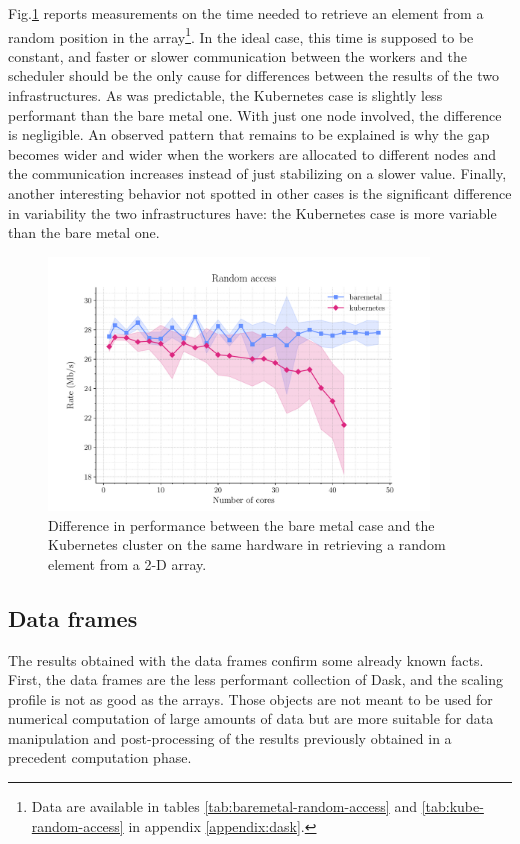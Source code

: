 Fig.\ref{fig:array-random-access} reports measurements on the time needed to
retrieve an element from a random position in the array\footnote{Data are
available in tables \ref{tab:baremetal-random-access} and
\ref{tab:kube-random-access} in appendix \ref{appendix:dask}.}. In the ideal
case, this time is supposed to be constant, and faster or slower communication
between the workers and the scheduler should be the only cause for differences
between the results of the two infrastructures. As was predictable, the
Kubernetes case is slightly less performant than the bare metal one. With just
one node involved, the difference is negligible. An observed pattern that
remains to be explained is why the gap becomes wider and wider when the workers
are allocated to different nodes and the communication increases instead of just
stabilizing on a slower value. Finally, another interesting behavior not spotted
in other cases is the significant difference in variability the two
infrastructures have: the Kubernetes case is more variable than the bare metal
one.

\begin{figure}
  \centering
  \includegraphics[width=0.9\textwidth]{img/chpt4/array-random-access}
  \caption{Difference in performance between the bare metal case and the
    Kubernetes cluster on the same hardware in retrieving a random element from
    a 2-D array.}
  \label{fig:array-random-access}
\end{figure}

\subsection{Data frames}

The results obtained with the data frames confirm some already known facts.
First, the data frames are the less performant collection of Dask, and the
scaling profile is not as good as the arrays.
Those objects are not meant to be used for numerical computation of large
amounts of data but are more suitable for data manipulation and post-processing
of the results previously obtained in a precedent computation phase.

